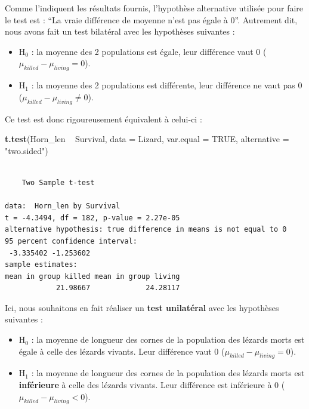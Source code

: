 \documentclass[a4paperpaper,]{article}
\newenvironment{Shaded}{\begin{snugshade}}{\end{snugshade}}
\newcommand{\DataTypeTok}[1]{\textcolor[rgb]{0.00,0.34,0.68}{#1}}
\newcommand{\KeywordTok}[1]{\textcolor[rgb]{0.12,0.11,0.11}{\textbf{#1}}}
\newcommand{\NormalTok}[1]{\textcolor[rgb]{0.12,0.11,0.11}{#1}}
\newcommand{\OperatorTok}[1]{\textcolor[rgb]{0.12,0.11,0.11}{#1}}
\newcommand{\OtherTok}[1]{\textcolor[rgb]{0.00,0.43,0.16}{#1}}
\newcommand{\StringTok}[1]{\textcolor[rgb]{0.75,0.01,0.01}{#1}}
\providecommand{\tightlist}{%
  \setlength{\itemsep}{0pt}\setlength{\parskip}{0pt}}
\begin{document}
Comme l'indiquent les résultats fournis, l'hypothèse alternative utilisée pour faire le test est : ``La vraie différence de moyenne n'est pas égale à 0''. Autrement dit, nous avons fait un test bilatéral avec les hypothèses suivantes :

\begin{itemize}
\tightlist
\item
  H\(_0\) : la moyenne des 2 populations est égale, leur différence vaut 0 (\(\mu_{killed}-\mu_{living} = 0\)).
\item
  H\(_1\) : la moyenne des 2 populations est différente, leur différence ne vaut pas 0 (\(\mu_{killed}-\mu_{living} \neq 0\)).
\end{itemize}

Ce test est donc rigoureusement équivalent à celui-ci :

\begin{Shaded}
\begin{Highlighting}[]
\KeywordTok{t.test}\NormalTok{(Horn_len }\OperatorTok{~}\StringTok{ }\NormalTok{Survival, }
       \DataTypeTok{data =}\NormalTok{ Lizard, }\DataTypeTok{var.equal =} \OtherTok{TRUE}\NormalTok{,}
       \DataTypeTok{alternative =} \StringTok{"two.sided"}\NormalTok{)}
\end{Highlighting}
\end{Shaded}

\begin{verbatim}

    Two Sample t-test

data:  Horn_len by Survival
t = -4.3494, df = 182, p-value = 2.27e-05
alternative hypothesis: true difference in means is not equal to 0
95 percent confidence interval:
 -3.335402 -1.253602
sample estimates:
mean in group killed mean in group living 
            21.98667             24.28117 
\end{verbatim}

Ici, nous souhaitons en fait réaliser un \textbf{test unilatéral} avec les hypothèses suivantes :

\begin{itemize}
\tightlist
\item
  H\(_0\) : la moyenne de longueur des cornes de la population des lézards morts est égale à celle des lézards vivants. Leur différence vaut 0 (\(\mu_{killed}-\mu_{living} = 0\)).
\item
  H\(_1\) : la moyenne de longueur des cornes de la population des lézards morts est \textbf{inférieure} à celle des lézards vivants. Leur différence est inférieure à 0 (\(\mu_{killed}-\mu_{living} < 0\)).
\end{itemize}
\end{document}
